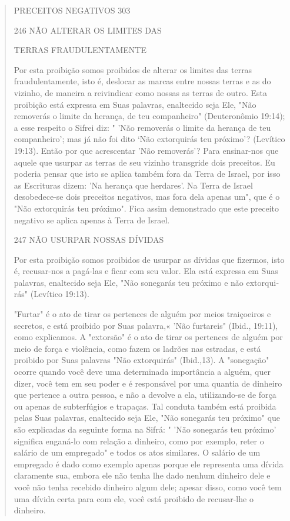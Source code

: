 \begin{quote}
PRECEITOS NEGATIVOS 303

246 NÃO ALTERAR OS LIMITES DAS

TERRAS FRAUDULENTAMENTE

Por esta proibição somos proibidos de alterar os limites das terras
fraudulentamente, isto é, deslocar as marcas entre nossas terras e as do
vizinho, de maneira a reivindicar como nossas as terras de outro. Esta
proibição está expressa em Suas palavras, enaltecido seja Ele, "Não
removerás o limite da he­rança, de teu companheiro" (Deuteronômio
19:14); a esse respeito o Sifrei diz: " 'Não removerás o limite da
herança de teu companheiro'; mas já não foi dito `Não extorquirás teu
próximo'? (Levítico 19:13). Então por que acrescentar 'Não removerás'?
Para ensinar-nos que aquele que usurpar as terras de seu vizinho
transgride dois preceitos. Eu poderia pensar que isto se aplica também
fora da Terra de Israel, por isso as Escrituras dizem: 'Na herança que
herdares'. Na Ter­ra de Israel desobedece-se dois preceitos negativos,
mas fora dela apenas um", que é o "Não extorquirás teu próximo". Fica
assim demonstrado que este pre­ceito negativo se aplica apenas à Terra
de Israel.

247 NÃO USURPAR NOSSAS DÍVIDAS

Por esta proibição somos proibidos de usurpar as dívidas que fizer­mos,
isto é, recusar-nos a pagá-las e ficar com seu valor. Ela está expressa
em Suas palavras, enaltecido seja Ele, "Não sonegarás teu próximo e não
extorqui­rás" (Levítico 19:13).

"Furtar" é o ato de tirar os pertences de alguém por meios traiçoei­ros
e secretos, e está proibido por Suas palavra,« 'Não furtareis" (Ibid.,
19:11), como explicamos. A "extorsão" é o ato de tirar os pertences de
alguém por meio de força e violência, como fazem os ladrões nas
estradas, e está proibido por Suas palavras "Não extorquirás"
(Ibid.,13). A "sonegação" ocorre quando você deve uma determinada
importância a alguém, quer dizer, você tem em seu poder e é responsável
por uma quantia de dinheiro que pertence a outra pessoa, e não a devolve
a ela, utilizando-se de força ou apenas de subterfúgios e trapaças. Tal
conduta também está proibida pelas Suas palavras, enaltecido seja Ele,
"Não sonegarás teu próximo" que são explicadas da seguinte forma na
Sifrá: " 'Não sonegarás teu próximo' significa enganá-lo com relação a
di­nheiro, como por exemplo, reter o salário de um empregado" e todos os
atos similares. O salário de um empregado é dado como exemplo apenas
porque ele representa uma dívida claramente sua, embora ele não tenha
lhe dado ne­nhum dinheiro dele e você não tenha recebido dinheiro algum
dele; apesar dis­so, como você tem uma dívida certa para com ele, você
está proibido de recusar-lhe o dinheiro.


\end{quote}
